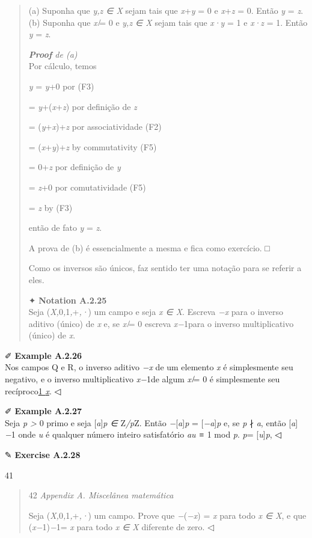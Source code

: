 \documentclass[
]{article}
\begin{document}
\begin{quote}
(a) Suponha que \emph{y,z ∈ X} sejam tais que \emph{x}+\emph{y} = 0 e
\emph{x}+\emph{z} = 0. Então \emph{y} = \emph{z}. (b) Suponha que
\emph{x ̸}= 0 e \emph{y,z ∈ X} sejam tais que \emph{x·y} = 1 e
\emph{x·z} = 1. Então \emph{y} = \emph{z}.

\emph{\textbf{Proof} de (a)}\\
Por cálculo, temos

\emph{y} = \emph{y}+0 por (F3)

= \emph{y}+(\emph{x}+\emph{z}) por definição de \emph{z}

= (\emph{y}+\emph{x})+\emph{z} por associatividade (F2)

= (\emph{x}+\emph{y})+\emph{z} by commutativity (F5)

= 0+\emph{z} por definição de \emph{y}

= \emph{z}+0 por comutatividade (F5)

= \emph{z} by (F3)

então de fato \emph{y} = \emph{z}.

A prova de (b) é essencialmente a mesma e fica como exercício. □

Como os inversos são únicos, faz sentido ter uma notação para se referir
a eles.

✦ \textbf{Notation A.2.25}\\
Seja (\emph{X,}0\emph{,}1\emph{,}+\emph{,·}) um campo e seja \emph{x ∈
X}. Escreva \emph{−x} para o inverso aditivo (único) de \emph{x} e, se
\emph{x ̸}= 0 escreva \emph{x−}1para o inverso multiplicativo (único) de
\emph{x}.
\end{quote}

✐ \textbf{Example A.2.26}\\
Nos campos Q e R, o inverso aditivo \emph{−x} de um elemento \emph{x} é
simplesmente seu negativo, e o inverso multiplicativo \emph{x−}1de algum
\emph{x ̸}= 0 é simplesmente seu recíproco\uline{1 \emph{x}}. ◁

✐ \textbf{Example A.2.27}\\
Seja \emph{p \textgreater{}} 0 primo e seja {[}\emph{a}{]}\emph{p ∈}
Z\emph{/p}Z. Então \emph{−}{[}\emph{a}{]}\emph{p} =
{[}\emph{−a}{]}\emph{p} e, se \emph{p} ∤ \emph{a}, então
{[}\emph{a}{]}\emph{−}1 onde \emph{u} é qualquer número inteiro
satisfatório \emph{au ≡} 1 mod \emph{p}. \emph{p}=
{[}\emph{u}{]}\emph{p}, ◁

✎ \textbf{Exercise A.2.28}

41

\begin{quote}
42 \emph{Appendix A. Miscelânea matemática}

Seja (\emph{X,}0\emph{,}1\emph{,}+\emph{,·}) um campo. Prove que
\emph{−}(\emph{−x}) = \emph{x} para todo \emph{x ∈ X}, e que
(\emph{x−}1)\emph{−}1= \emph{x} para todo \emph{x ∈ X} diferente de
zero. ◁
\end{quote}
\end{document}
